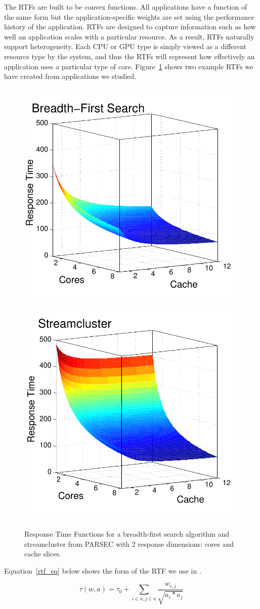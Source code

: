 The RTFs are built to be convex functions.  All applications have a
function of the same form but the application-specific weights are set
using the performance history of the application.  RTFs are designed
to capture information such as how well an application scales with a
particular resource. As a result, RTFs naturally support
heterogeneity.  Each CPU or GPU type is simply viewed as a different
resource type by the system, and thus the RTFs will represent how
effectively an application uses a particular type of
core. Figure~\ref{sample_rtf} shows two example RTFs we have created
from applications we studied.

\begin{figure}[hb]
\includegraphics*[bb=0 0 360 360,width=.49\columnwidth]{bfs-fig.pdf}
\includegraphics*[bb=0 0 360 360,width=.49\columnwidth]{streamcluster-fig.pdf}
\caption{\label{sample_rtf} Response Time Functions for a breadth-first search algorithm and streamcluster from PARSEC with 2 response dimensions: cores and cache slices.}
\end{figure}

Equation~\ref{rtf_eq} below shows the form of the RTF we use in \pacora.

\begin{equation}\label{rtf_eq}
\tau(w,a) = \tau_0 + \sum_{i\in n,j\in n}{\frac{w_{i,j}}{\sqrt{a_i * a_j}}}
\end{equation}


